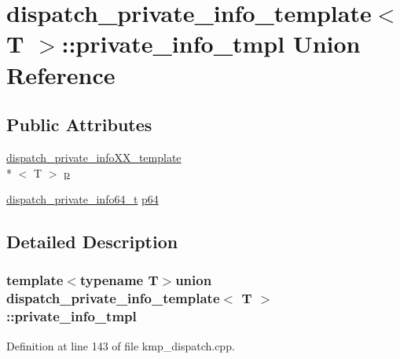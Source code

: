 \hypertarget{uniondispatch__private__info__template_1_1private__info__tmpl}{\section{dispatch\-\_\-private\-\_\-info\-\_\-template$<$ T $>$\-:\-:private\-\_\-info\-\_\-tmpl Union Reference}
\label{uniondispatch__private__info__template_1_1private__info__tmpl}
}
\subsection*{Public Attributes}
\begin{DoxyCompactItemize}
\item 
\hyperlink{structdispatch__private__infoXX__template}{dispatch\-\_\-private\-\_\-info\-X\-X\-\_\-template}\\*
$<$ T $>$ \hyperlink{uniondispatch__private__info__template_1_1private__info__tmpl_a3524d72db291bfb9465ece3b2f8fd9af}{p}
\item 
\hyperlink{kmp_8h_a0f4f3549766c34459bc0a3046d47d4ff}{dispatch\-\_\-private\-\_\-info64\-\_\-t} \hyperlink{uniondispatch__private__info__template_1_1private__info__tmpl_a048a68fb2a056c4a56815ed36290f278}{p64}
\end{DoxyCompactItemize}


\subsection{Detailed Description}
\subsubsection*{template$<$typename T$>$union dispatch\-\_\-private\-\_\-info\-\_\-template$<$ T $>$\-::private\-\_\-info\-\_\-tmpl}



Definition at line 143 of file kmp\-\_\-dispatch.\-cpp.



